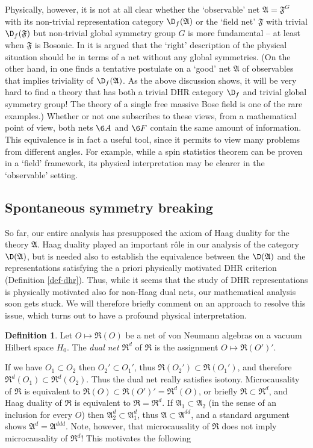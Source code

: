 \documentclass[12pt]{article}
\newcommand{\alg}[1]{\mathfrak{#1}}
\theoremstyle{definition}
\theoremstyle{definition}
\newtheorem{defn}[thm]{Definition}
\theoremstyle{remark}
\begin{document}
Physically, however, it is not at all clear whether the
`observable' net $\alg{A}=\alg{F}^G$ with its
non-trivial representation category $\D_f(\alg{A})$ or
the `field net' $\alg{F}$ with trivial $\D_f(\alg{F})$
but non-trivial global symmetry group $G$ is more
fundamental -- at least when $\alg{F}$ is Bosonic. In
\cite{haag} it is argued that the `right' description
of the physical situation should be in terms of a net
without any global symmetries. (On the other hand, in
\cite[Section III.4.2]{haag} one finds a tentative
postulate on a `good' net $\alg{A}$ of observables that
implies triviality of $\D_f(\alg{A})$. As the above
discussion shows, it will be very hard to find a theory
that has both a trivial DHR category $\D_f$ and trivial
global symmetry group! The theory of a single free
massive Bose field is one of the rare examples.)
Whether or not one subscribes to these views, from a
mathematical point of view, both nets $\6A$ and $\6F$
contain the same amount of information. This
equivalence is in fact a useful tool, since it permits
to view many problems from different angles. For
example, while a spin statistics theorem can be proven
in a `field' framework, its physical interpretation may
be clearer in the `observable' setting.


\subsection{Spontaneous symmetry breaking} \label{ssb}

So far, our entire analysis has presupposed the axiom of Haag duality for the theory
$\alg{A}$. Haag duality played an important r\^ole in our analysis of the category
$\D(\alg{A})$, but is needed also to establish the equivalence between the
$\D(\alg{A})$ and the representations satisfying the a priori physically motivated
DHR criterion (Definition \ref{def-dhr}). Thus, while it seems that the study of DHR
representations is physically motivated also for non-Haag dual nets, our mathematical
analysis soon gets stuck. We will therefore briefly comment on an approach to resolve
this issue, which turns out to have a profound physical interpretation.

\begin{defn} Let $O\mapsto\alg{R}(O)$ be a net of von Neumann algebras on a vacuum Hilbert space $H_0$.
The \emph{dual net} $\alg{R}^d$ of $\alg{R}$ is the assignment $O\mapsto \alg{R}(O')'$.
\end{defn}

If we have $O_1\subset O_2$ then $O_2'\subset O_1'$, thus
$\alg{R}(O_2')\subset\alg{R}(O_1')$, and therefore
$\alg{R}^d(O_1)\subset\alg{R}^d(O_2)$. Thus the dual net really satisfies isotony.
Microcausality of $\alg{R}$ is equivalent to
$\alg{R}(O)\subset\alg{R}(O')'=\alg{R}^d(O)$, or briefly $\alg{R}\subset\alg{R}^d$,
and Haag duality of $\alg{R}$ is equivalent to $\alg{R}=\alg{R}^d$. If
$\alg{A}_1\subset\alg{A}_2$ (in the sense of an inclusion for every $O$) then
$\alg{A}^d_2\subset\alg{A}^d_1$, thus $\alg{A}\subset\alg{A}^{dd}$, and a standard
argument shows $\alg{A}^{d}=\alg{A}^{ddd}$. Note, however, that microcausality of
$\alg{R}$ does not imply microcausality of $\alg{R}^d$! This motivates the following
\end{document}
